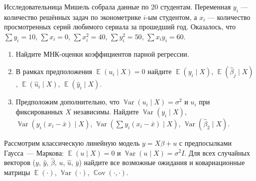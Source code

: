 \documentclass[12pt]{article}
\DeclareMathOperator{\Cov}{\mathbb{C}ov}
\DeclareMathOperator{\Var}{\mathbb{V}ar}
\DeclareMathOperator{\E}{\mathbb{E}}
\newcommand{\hb}{\hat{\beta}}
\newcommand{\hy}{\hat{y}}
\newenvironment{sol}{}{}
\begin{document}
\begin{problem}
Исследовательница Мишель собрала данные по 20 студентам. 
Переменная $y_i$ --- количество решённых задач по эконометрике $i$-ым студентом, 
а $x_i$ --- количество просмотренных серий любимого сериала за прошедший год. 
Оказалось, что $\sum y_i = 10$, $\sum x_i = 0$, $\sum x_i^2 = 40$, $\sum y_i^2 = 50$, $\sum x_i y_i = 60$.

\begin{enumerate}
\item Найдите МНК-оценки коэффициентов парной регрессии.
\item В рамках предположения $\E(u_i \mid X) = 0$ найдите $\E(y_i \mid X)$, $\E(\hb_j \mid X)$, $\E(\hat u_i \mid X)$, $\E(\hat y_i \mid X)$.
\item Предположим дополнительно, что $\Var(u_i \mid X)=\sigma^2$ и $u_i$ при фиксированных $X$ независимы. 
Найдите $\Var(y_i \mid X)$, $\Var(y_i (x_i - \bar x) \mid X)$, $\Var(\sum y_i (x_i - \bar x) \mid X)$, $\Var(\hb_2 \mid X)$.
\end{enumerate}
\begin{sol}

  \end{sol}
\end{problem}

\begin{problem}
Рассмотрим классическую линейную модель $y=X\beta + u$ с предпосылками Гаусса~--- Маркова: $\E(u \mid X) = 0$ и $\Var(u \mid X) = \sigma^2 I$.
Для всех случайных векторов ($y$, $\hy$, $\hb$, $u$, $\hat u$, $\bar y$) найдите все возможные ожидания и ковариационные матрицы
$\E(\cdot)$, $\Var(\cdot)$, $\Cov(\cdot, \cdot)$.
\begin{sol}
\end{sol}
\end{problem}
\end{document}
